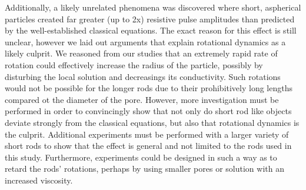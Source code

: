 		Additionally, a likely unrelated phenomena was discovered where short, aspherical particles created far greater (up to 2x) resistive pulse amplitudes than predicted by the well-established classical equations. The exact reason for this effect is still unclear, however we laid out arguments that explain rotational dynamics as a likely culprit. We reasoned from our studies that an extremely rapid rate of rotation could effectively increase the radius of the particle, possibly by disturbing the local solution and decreasings its conductivity. Such rotations would not be possible for the longer rods due to their prohibitively long lengths compared ot the diameter of the pore. However, more investigation must be performed in order to convincingly show that not only do short rod like objects deviate strongly from the classical equations, but also that rotational dynamics is the culprit. Additional experiments must be performed with a larger variety of short rods to show that the effect is general and not limited to the rods used in this study. Furthermore, experiments could be designed in such a way as to retard the rods' rotations, perhaps by using smaller pores or solution with an increased viscosity.

	
	
		
		
		
	

	




